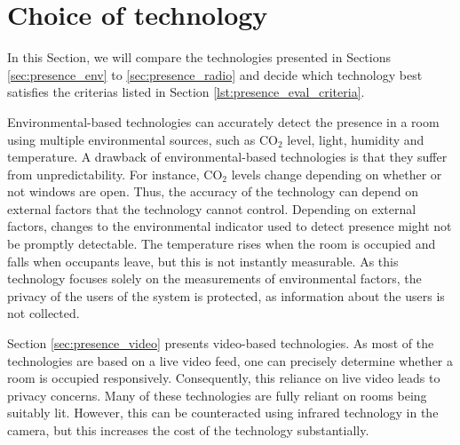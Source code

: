 \section{Choice of technology}
In this Section, we will compare the technologies presented in Sections \ref{sec:presence_env} to \ref{sec:presence_radio} and decide which technology best satisfies the criterias listed in Section \ref{lst:presence_eval_criteria}. 

Environmental-based technologies can accurately detect the presence in a room using multiple environmental sources, such as $\text{CO}_{2}$ level, light, humidity and temperature.
A drawback of environmental-based technologies is that they suffer from unpredictability.
For instance, $\text{CO}_{2}$ levels change depending on whether or not windows are open.  
Thus, the accuracy of the technology can depend on external factors that the technology cannot control.
Depending on external factors, changes to the environmental indicator used to detect presence might not be promptly detectable.
The temperature rises when the room is occupied and falls when occupants leave, but this is not instantly measurable.  
As this technology focuses solely on the measurements of environmental factors, the privacy of the users of the system is protected, as information about the users is not collected.

Section \ref{sec:presence_video} presents video-based technologies.
As most of the technologies are based on a live video feed, one can precisely determine whether a room is occupied responsively. 
Consequently, this reliance on live video leads to privacy concerns.
Many of these technologies are fully reliant on rooms being suitably lit.
However, this can be counteracted using infrared technology in the camera, but this increases the cost of the technology substantially.   

